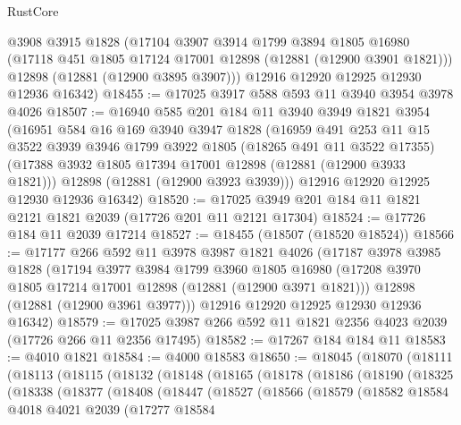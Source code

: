 \begin{lexlean}{RustCore}
\begin{coremodule}
      @3908
      @3915
      @1828
      (@17104
        @3907
        @3914
        @1799
        @3894
        @1805
        @16980
        (@17118 @451 @1805 @17124 @17001 @12898 (@12881 (@12900 @3901 @1821)))
        @12898
        (@12881 (@12900 @3895 @3907)))
      @12916
      @12920
      @12925
      @12930
      @12936
      @16342)
@18455 := @17025 @3917 @588 @593 @11 @3940 @3954 @3978 @4026
@18507 := @16940
    @585
    @201
    @184
    @11
    @3940
    @3949
    @1821
    @3954
    (@16951
      @584
      @16
      @169
      @3940
      @3947
      @1828
      (@16959
        @491
        @253
        @11
        @15
        @3522
        @3939
        @3946
        @1799
        @3922
        @1805
        (@18265 @491 @11 @3522 @17355)
        (@17388 @3932 @1805 @17394 @17001 @12898 (@12881 (@12900 @3933 @1821)))
        @12898
        (@12881 (@12900 @3923 @3939)))
      @12916
      @12920
      @12925
      @12930
      @12936
      @16342)
@18520 := @17025 @3949 @201 @184 @11 @1821 @2121 @1821 @2039 (@17726 @201 @11 @2121 @17304)
@18524 := @17726 @184 @11 @2039 @17214
@18527 := @18455 (@18507 (@18520 @18524))
@18566 := @17177
    @266
    @592
    @11
    @3978
    @3987
    @1821
    @4026
    (@17187
      @3978
      @3985
      @1828
      (@17194
        @3977
        @3984
        @1799
        @3960
        @1805
        @16980
        (@17208 @3970 @1805 @17214 @17001 @12898 (@12881 (@12900 @3971 @1821)))
        @12898
        (@12881 (@12900 @3961 @3977)))
      @12916
      @12920
      @12925
      @12930
      @12936
      @16342)
@18579 := @17025 @3987 @266 @592 @11 @1821 @2356 @4023 @2039 (@17726 @266 @11 @2356 @17495)
@18582 := @17267 @184 @184 @11
@18583 := @4010 @1821
@18584 := @4000 @18583
@18650 := @18045
    (@18070
      (@18111
        (@18113
          (@18115
            (@18132
              (@18148
                (@18165
                  (@18178
                    (@18186
                      (@18190
                        (@18325
                          (@18338
                            (@18377
                              (@18408
                                (@18447
                                  (@18527
                                    (@18566
                                      (@18579
                                        (@18582
                                          @18584
                                          @4018
                                          @4021
                                          @2039
                                          (@17277
                                            @18584

\end{coremodule}
\end{lexlean}
